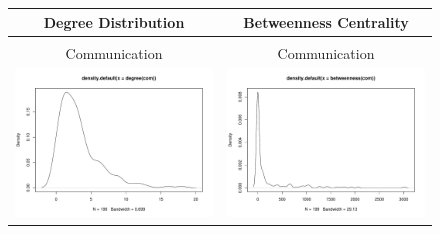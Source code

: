 \documentclass[fleqn,12pt]{wlscirep}
\begin{document}
\begin{figure}
\begin{longtable}[!h]{cc}
Degree Distribution & Betweenness Centrality\\
\hline \\[-1.8ex]
Communication & Communication\\
\includegraphics[height=.2\textheight, clip=true, trim=1cm 1cm 0cm 2cm]{figures/deg_com.pdf} & 
\includegraphics[height=.2\textheight, clip=true, trim=1cm 1cm 0cm 2cm]{figures/cen_com.pdf} \\ 


\end{longtable}
\end{figure}
\end{document}
